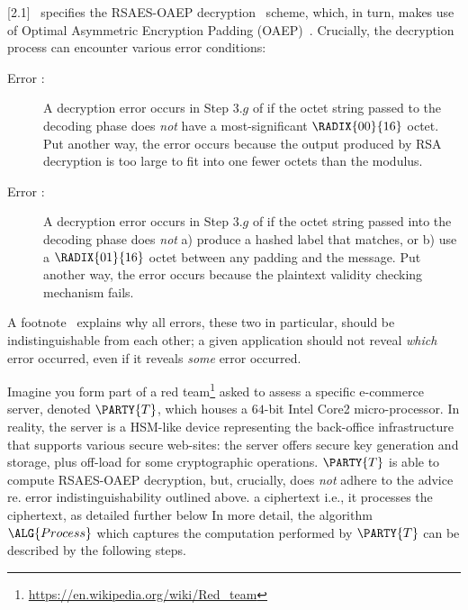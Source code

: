 %



[2.1]~\cite{SCALE:RFC:3447}
specifies the
RSAES-OAEP decryption~\cite[Section 7.1]{SCALE:RFC:3447}
scheme, which, in turn, makes use of 
Optimal Asymmetric Encryption Padding (OAEP)~\cite{SCALE:BelRog:94}.  
Crucially, the decryption process can encounter various error conditions:

\begin{description}
\item[Error :]
     A decryption error occurs in Step $3.g$ of  
     if the octet string passed to the decoding phase
     does {\em not} have a most-significant $\RADIX{00}{16}$ octet.
     Put another way, the error occurs because 
     the output produced by RSA decryption is too large to fit into one 
     fewer octets than the modulus.
\item[Error :]
     A decryption error occurs in Step $3.g$ of  
     if the octet string passed into the decoding phase 
     does {\em not} a) produce a hashed label that matches, or b) use a
     $\RADIX{01}{16}$ octet between any padding and the message.
     Put another way, the error occurs because 
     the plaintext validity checking mechanism fails.
\end{description}

\noindent
A footnote~\cite[Section 7.1.2]{SCALE:RFC:3447} explains why all errors, 
these two in particular, should be indistinguishable from each other; a
given application should not reveal {\em which} error occurred, even if
it reveals {\em some} error occurred.  

Imagine you form part of a red team\footnote{
\url{https://en.wikipedia.org/wiki/Red_team}
} asked to assess a specific e-commerce server, denoted 
$\PARTY{T}$, 
which houses a $64$-bit Intel Core2 micro-processor.  
In reality, the server is a HSM-like device representing the back-office 
infrastructure that supports various secure web-sites: the server offers
secure key generation and storage, plus off-load for some cryptographic 
operations.  
$\PARTY{T}$ 
is able to compute RSAES-OAEP decryption, but, crucially, does {\em not} 
adhere to the advice re. error indistinguishability outlined above.
{a ciphertext}
{i.e., it processes the ciphertext, as detailed further below}
{} %
In more detail, the algorithm
$\ALG{Process}$
which captures the computation performed by
$\PARTY{T}$
can be described by the following steps.

